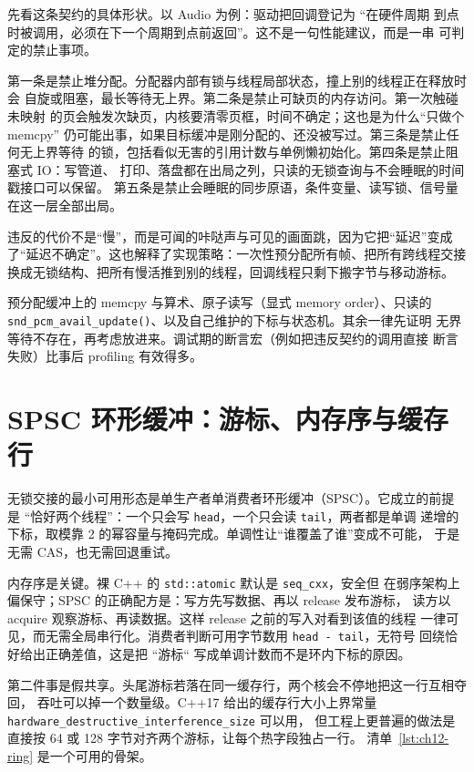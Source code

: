 \documentclass[12pt,a4paper,fontset=fandol]{ctexbook}
\newcommand{\cpp}[1]{C++#1}
\newcommand{\Fn}[1]{\texttt{#1()}}
\newcommand{\Tp}[1]{\texttt{#1}}
\newcommand{\Bk}{\discretionary{}{}{}}
\newcommand{\Lang}[1]{\textsf{#1}}
\newcommand{\CPP}{\Lang{C++}}
\newcommand{\DomAud}{\Lang{Audio}}
\begin{document}
先看这条契约的具体形状。以 \DomAud{} 为例：驱动把回调登记为 ``在硬件周期
到点时被调用，必须在下一个周期到点前返回''。这不是一句性能建议，而是一串
可判定的禁止事项。

第一条是禁止堆分配。分配器内部有锁与线程局部状态，撞上别的线程正在释放时会
自旋或阻塞，最长等待无上界。第二条是禁止可缺页的内存访问。第一次触碰未映射
的页会触发次缺页，内核要清零页框，时间不确定；这也是为什么``只做个 memcpy''
仍可能出事，如果目标缓冲是刚分配的、还没被写过。第三条是禁止任何无上界等待
的锁，包括看似无害的引用计数与单例懒初始化。第四条是禁止阻塞式 IO：写管道、
打印、落盘都在出局之列，只读的无锁查询与不会睡眠的时间戳接口可以保留。
第五条是禁止会睡眠的同步原语，条件变量、读写锁、信号量在这一层全部出局。

违反的代价不是``慢''，而是可闻的咔哒声与可见的画面跳，因为它把``延迟''变成
了``延迟不确定''。这也解释了实现策略：一次性预分配所有帧、把所有跨线程交接
换成无锁结构、把所有慢活推到别的线程，回调线程只剩下搬字节与移动游标。

\begin{guideline}[title={回调线程里允许存在的东西}]
预分配缓冲上的 memcpy 与算术、原子读写（显式 memory order）、只读的
\Fn{snd\_pcm\_avail\_update}、以及自己维护的下标与状态机。其余一律先证明
无界等待不存在，再考虑放进来。调试期的断言宏（例如把违反契约的调用直接
断言失败）比事后 profiling 有效得多。
\end{guideline}

\section{SPSC 环形缓冲：游标、内存序与缓存行}

无锁交接的最小可用形态是单生产者单消费者环形缓冲（SPSC）。它成立的前提是
``恰好两个线程''：一个只会写 \Tp{head}，一个只会读 \Tp{tail}，两者都是单调
递增的下标，取模靠 2 的幂容量与掩码完成。单调性让``谁覆盖了谁''变成不可能，
于是无需 CAS，也无需回退重试。

内存序是关键。裸 \CPP{} 的 \Tp{std::atomic} 默认是 \Tp{seq\_cxx}，安全但
在弱序架构上偏保守；SPSC 的正确配方是：写方先写数据、再以 release 发布游标，
读方以 acquire 观察游标、再读数据。这样 release 之前的写入对看到该值的线程
一律可见，而无需全局串行化。消费者判断可用字节数用 \Tp{head - tail}，无符号
回绕恰好给出正确差值，这是把 ``游标`` 写成单调计数而不是环内下标的原因。

第二件事是假共享。头尾游标若落在同一缓存行，两个核会不停地把这一行互相夺回，
吞吐可以掉一个数量级。\cpp{17} 给出的缓存行大小上界常量
\Tp{hardware\_destructive\Bk\_interference\Bk\_size} 可以用，
但工程上更普遍的做法是直接按 64 或 128 字节对齐两个游标，让每个热字段独占一行。
清单~\ref{lst:ch12-ring} 是一个可用的骨架。
\end{document}
